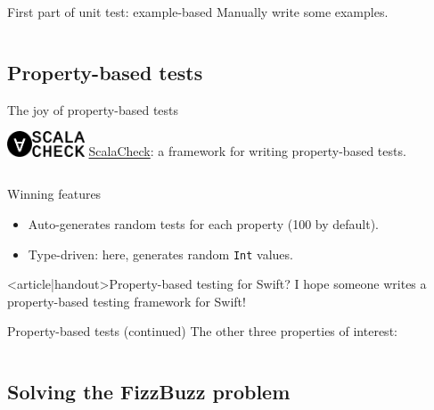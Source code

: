 \begin{frame}[fragile]{First part of \alert{unit test}: example-based}
  Manually write some \alert{examples}.

  \inputminted{scala}{FizzBuzzSpec1.scala}
\end{frame}

\subsection{Property-based tests}

\begin{frame}[fragile]{The joy of property-based tests}
    \begin{block}{\includegraphics[height=0.75cm]{logo_forall_h61.png}\includegraphics[height=0.75cm]{logo_scalacheck_h61.png}}
      \href{http://scalacheck.org/}{ScalaCheck}: a framework for writing \alert{property-based} tests.
  \end{block}

  \inputminted{scala}{FizzBuzzSpec2.scala}

  \begin{block}{Winning features}
    \begin{itemize}
    \item Auto-generates \alert{random} tests for each property (100 by default).
    \item \alert{Type-driven}: here, generates random \texttt{Int} values.
    \end{itemize}
  \end{block}
\end{frame}

\begin{frame}<article|handout>{Property-based testing for Swift?}
  I hope someone writes a property-based testing framework for Swift!
\end{frame}

\begin{frame}[fragile]{Property-based tests (continued)}
  The other three properties of interest:

  \inputminted{scala}{FizzBuzzSpec3.scala}
\end{frame}

\subsection{Solving the FizzBuzz problem}

